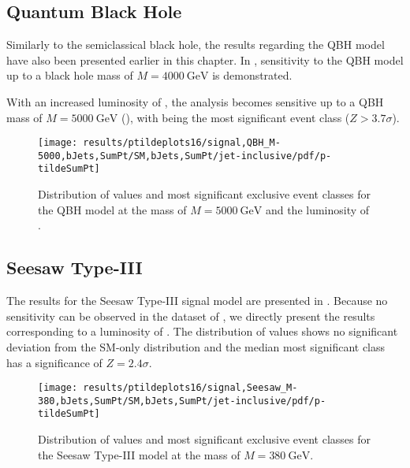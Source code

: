 \subsection{Quantum Black Hole}
\label{sec:results_qbh}

Similarly to the semiclassical black hole, the results regarding the \ac{QBH} model have also been presented earlier in this chapter. In , sensitivity to the \ac{QBH} model up to a black hole mass of $M = \SI{4000}{\GeV}$ is demonstrated.

With an increased luminosity of \lumiB, the analysis becomes sensitive up to a \ac{QBH} mass of  $M = \SI{5000}{\GeV}$ (), with  being the most significant event class ($Z > \num{3.7}\sigma$).

\begin{figure}
    \centering
    \texttt{[image: results/ptildeplots16/signal,QBH\_M-5000,bJets,SumPt/SM,bJets,SumPt/jet-inclusive/pdf/p-tildeSumPt]}
    {
        
    }
    \caption{Distribution of \ptilde values and most significant exclusive event classes for the \acl{QBH} model at the mass of $M = \SI{5000}{\GeV}$ and the luminosity of \lumiB.}
    \label{fig:result_qbh_5000}
\end{figure}


\subsection{Seesaw Type-III}
\label{sec:results_seesaw}

The results for the Seesaw Type-III signal model are presented in . Because no sensitivity can be observed in the dataset of \lumiA, we directly present the results corresponding to a luminosity of \lumiB.
The distribution of \ptilde values shows no significant deviation from the \ac{SM}-only distribution and the median most significant class has a significance of $Z = \num{2.4}\sigma$.

\begin{figure}
    \centering
    \texttt{[image: results/ptildeplots16/signal,Seesaw\_M-380,bJets,SumPt/SM,bJets,SumPt/jet-inclusive/pdf/p-tildeSumPt]}
    {
        
    }
    \caption{Distribution of \ptilde values and most significant exclusive event classes for the Seesaw Type-III model at the mass of $M = \SI{380}{\GeV}$.}
    \label{fig:result_seesaw}
\end{figure}

